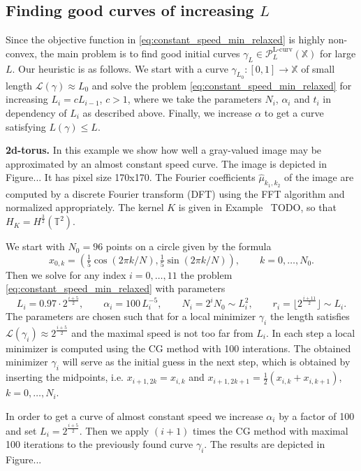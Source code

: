 \documentclass[draft,
a4paper,11pt,DIV=11,%
abstract=on%
]{scrartcl}
\DeclareMathOperator{\Lcurve}{L-curv}
\begin{document}
\subsection{Finding good curves of increasing $L$}

Since the objective function in \eqref{eq:constant_speed_min_relaxed} is highly non-convex, the main problem is to find good initial curves $\gamma_{L} \in  \mathcal P_{L}^{\Lcurve}(\mathbb X)$ for large $L$. Our heuristic is as follows. We start with a curve $\gamma_{L_{0}}:[0,1]\to \mathbb X$ of small length $\mathcal L(\gamma) \approx L_{0}$ and solve the problem \eqref{eq:constant_speed_min_relaxed} for increasing $L_{i} = c L_{i-1}$, $c>1$, where we take the parameters $N_{i}$, $\alpha_{i}$ and $t_{i}$ in dependency of $L_{i}$ as described above. Finally, we increase $\alpha$ to get a curve satisfying $L(\gamma) \le L$. 

\textbf{2d-torus.}
In this example we show how well a gray-valued image may be approximated by an almost constant speed curve. The image is depicted in Figure... It has pixel size 170x170. The Fourier coefficients $\hat \mu_{k_{1},k_{2}}$ of the image are computed by a discrete Fourier transform (DFT) using the FFT algorithm and normalized appropriately. The kernel $K$ is given in Example~{\color{blue} TODO}, so that $H_{K} = H^{\frac32}(\mathbb T^{2})$.

We start with $N_{0}=96$ points on a circle given by the formula
\[
  x_{0,k} = ( \tfrac15 \cos(2\pi k/N), \tfrac15 \sin(2\pi k/N)), \qquad k=0,\dots,N_{0}.
\]
Then we solve for any index $i=0,\dots,11$ the problem \eqref{eq:constant_speed_min_relaxed} with parameters
\[
  L_{i} = 0.97\cdot 2^{\frac{i+5}{2}},\qquad \alpha_{i} = 100\,L_{i}^{-5},\qquad N_{i} = 2^{i} N_{0} \sim L_{i}^{2}, \qquad r_{i}= \lfloor 2^{\frac{i+11}{2}} \rfloor \sim L_{i}.
\]
The parameters are chosen such that
for a local minimizer $\gamma_{i}$ the length satisfies $\mathcal L(\gamma_{i}) \approx 2^{\frac{i+5}{2}}$ and the maximal speed is not too far from $L_{i}$. In each step a local minimizer is computed using the CG method with 100 interations. The obtained minimizer $\gamma_{i}$ will serve as the initial guess in the next step, which is obtained by inserting the midpoints, i.e. $x_{i+1,2k}=x_{i,k}$ and $x_{i+1,2k+1} = \frac{1}{2}(x_{i,k}+ x_{i,k+1})$, $k=0,\dots,N_{i}$. 

In order to get a curve of almost constant speed we increase $\alpha_{i}$ by a factor of 100 and set $L_{i} = 2^{\frac{i+5}{2}}$. Then we apply $(i+1)$ times the CG method with maximal 100 iterations to the previously found curve $\gamma_{i}$. The results are depicted in Figure... 
\end{document}
